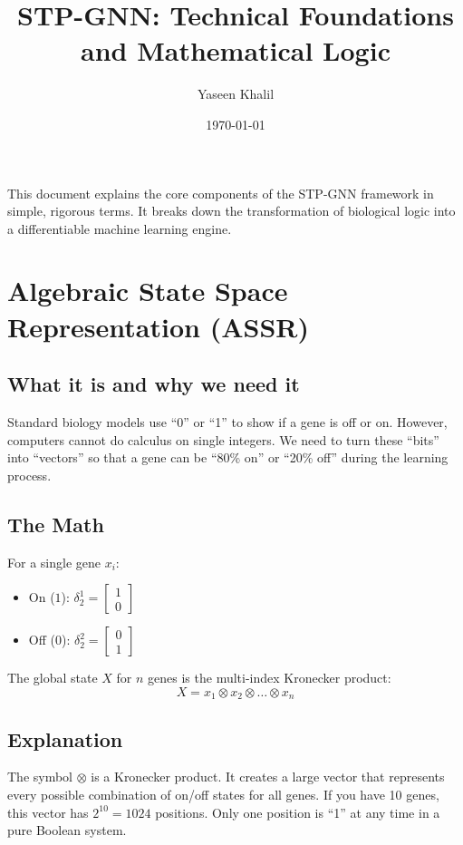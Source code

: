 \documentclass[11pt,a4paper]{article}
\title{STP-GNN: Technical Foundations and Mathematical Logic}
\author{Yaseen Khalil}
\date{\today}
\begin{document}
\maketitle

This document explains the core components of the STP-GNN framework in simple, rigorous terms. It breaks down the transformation of biological logic into a differentiable machine learning engine.

\section{Algebraic State Space Representation (ASSR)}

\subsection*{What it is and why we need it}
Standard biology models use ``0'' or ``1'' to show if a gene is off or on. However, computers cannot do calculus on single integers. We need to turn these ``bits'' into ``vectors'' so that a gene can be ``80\% on'' or ``20\% off'' during the learning process.

\subsection*{The Math}
For a single gene $x_i$:
\begin{itemize}
    \item On ($1$): $\delta_2^1 = \begin{bmatrix} 1 \\ 0 \end{bmatrix}$
    \item Off ($0$): $\delta_2^2 = \begin{bmatrix} 0 \\ 1 \end{bmatrix}$
\end{itemize}

The global state $X$ for $n$ genes is the multi-index Kronecker product:
\begin{equation}
X = x_1 \otimes x_2 \otimes \dots \otimes x_n
\end{equation}

\subsection*{Explanation}
The symbol $\otimes$ is a Kronecker product. It creates a large vector that represents every possible combination of on/off states for all genes. If you have 10 genes, this vector has $2^{10} = 1024$ positions. Only one position is ``1'' at any time in a pure Boolean system.
\end{document}
